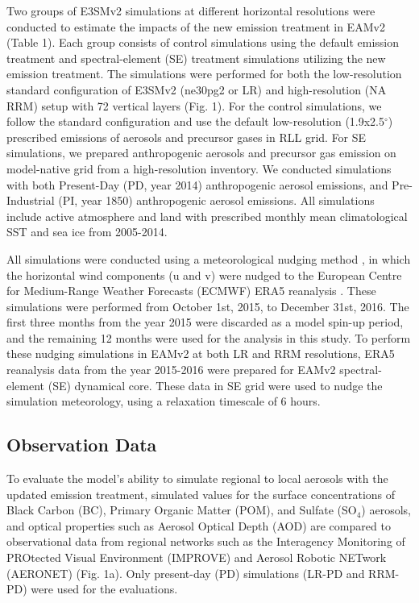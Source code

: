 Two groups of E3SMv2 simulations at different horizontal resolutions were conducted to estimate the impacts of the new emission treatment in EAMv2 (Table 1).  Each group consists of control simulations using the default emission treatment and spectral-element (SE) treatment simulations utilizing the new emission treatment. The simulations were performed for both the low-resolution standard configuration of E3SMv2 (ne30pg2 or LR) and high-resolution (NA RRM) setup with 72 vertical layers (Fig. 1). For the control simulations, we follow the standard configuration and use the default low-resolution (1.9x2.5$^{\circ}$) prescribed emissions of aerosols and precursor gases in RLL grid. For SE simulations, we prepared anthropogenic aerosols and precursor gas emission on model-native grid from a high-resolution inventory. We conducted simulations with both Present-Day (PD, year 2014) anthropogenic aerosol emissions, and Pre-Industrial (PI, year 1850) anthropogenic aerosol emissions. All simulations include active atmosphere and land with prescribed monthly mean climatological SST and sea ice from 2005-2014.

All simulations were conducted using a meteorological nudging method \citep{sun2019impact,zhang2022further}, in which the horizontal wind components (u and v) were nudged to the European Centre for Medium-Range Weather Forecasts (ECMWF) ERA5 reanalysis \citep{hersbach2020era5}. These simulations were performed from October 1st, 2015, to December 31st, 2016. The first three months from the year 2015 were discarded as a model spin-up period, and the remaining 12 months were used for the analysis in this study. To perform these nudging simulations in EAMv2 at both LR and RRM resolutions, ERA5 reanalysis data from the year 2015-2016 were prepared for EAMv2 spectral-element (SE) dynamical core. These data in SE grid were used to nudge the simulation meteorology, using a relaxation timescale of 6 hours.

\subsection{Observation Data}

To evaluate the model's ability to simulate regional to local aerosols with the updated emission treatment, simulated values for the surface concentrations of Black Carbon (BC), Primary Organic Matter (POM), and Sulfate (SO$_4$) aerosols, and optical properties such as Aerosol Optical Depth (AOD) are compared to observational data from regional networks such as the Interagency Monitoring of PROtected Visual Environment (IMPROVE) and Aerosol Robotic NETwork (AERONET) (Fig. 1a). Only present-day (PD) simulations (LR-PD and RRM-PD) were used for the evaluations.

